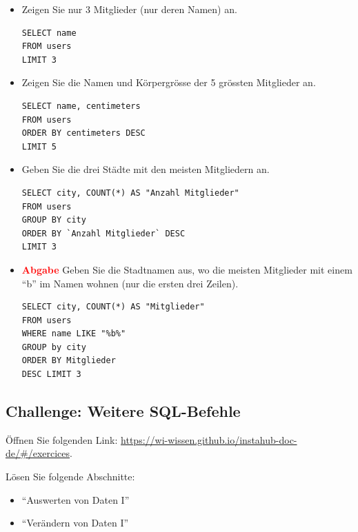 \begin{aufgabe}{}
\begin{itemize}
\item Zeigen Sie nur 3 Mitglieder (nur deren Namen) an.
\begin{myantwort}
\begin{lstlisting}[style=sql]
SELECT name
FROM users
LIMIT 3
\end{lstlisting}
\end{myantwort}
\item Zeigen Sie die Namen und Körpergrösse der 5 grössten Mitglieder an.
\begin{myantwort}
\begin{lstlisting}[style=sql]
SELECT name, centimeters
FROM users
ORDER BY centimeters DESC
LIMIT 5
\end{lstlisting}
\end{myantwort}
\item Geben Sie die drei Städte mit den meisten Mitgliedern an.
\begin{myantwort}
\begin{lstlisting}[style=sql]
SELECT city, COUNT(*) AS "Anzahl Mitglieder"
FROM users
GROUP BY city
ORDER BY `Anzahl Mitglieder` DESC
LIMIT 3
\end{lstlisting}
\end{myantwort}
\item \textcolor{red}{\textbf{Abgabe}} Geben Sie die Stadtnamen aus, wo die meisten Mitglieder mit einem ``b'' im Namen wohnen (nur die ersten drei Zeilen).
\begin{myantwort}
\begin{lstlisting}[style=sql]
SELECT city, COUNT(*) AS "Mitglieder"
FROM users 
WHERE name LIKE "%b%" 
GROUP by city 
ORDER BY Mitglieder
DESC LIMIT 3
\end{lstlisting}
\end{myantwort}
\end{itemize}
\end{aufgabe}


\subsection{\textbf{Challenge}: Weitere \gls{SQL}-Befehle}

Öffnen Sie folgenden Link: \url{https://wi-wissen.github.io/instahub-doc-de/#/exercices}.

Lösen Sie folgende Abschnitte:

\begin{itemize}
\item ``Auswerten von Daten I''
\item ``Verändern von Daten I''
\end{itemize} 

